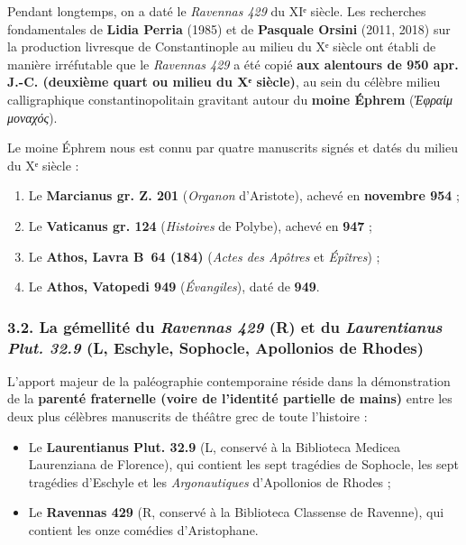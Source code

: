 \documentclass[11pt, a4paper, twoside]{article}
\renewcommand{\_}{\origunderscore\penalty0\relax}
\newcommand{\R}{\textbf{R}}
\def\R{R}%
\begin{document}
Pendant longtemps, on a daté le \textit{Ravennas 429} du XIᵉ siècle. Les recherches fondamentales de \textbf{Lidia Perria} (1985) et de \textbf{Pasquale Orsini} (2011, 2018) sur la production livresque de Constantinople au milieu du Xᵉ siècle ont établi de manière irréfutable que le \textit{Ravennas 429} a été copié \textbf{aux alentours de 950 apr. J.-C. (deuxième quart ou milieu du Xᵉ siècle)}, au sein du célèbre milieu calligraphique constantinopolitain gravitant autour du \textbf{moine Éphrem} (\textit{Ἐφραίμ μοναχός}).

Le moine Éphrem nous est connu par quatre manuscrits signés et datés du milieu du Xᵉ siècle :
\begin{enumerate}[leftmargin=1.6em, itemsep=2pt]
  \item Le \textbf{Marcianus gr. Z. 201} (\textit{Organon} d'Aristote), achevé en \textbf{novembre 954} ;
  \item Le \textbf{Vaticanus gr. 124} (\textit{Histoires} de Polybe), achevé en \textbf{947} ;
  \item Le \textbf{Athos, Lavra B~64 (184)} (\textit{Actes des Apôtres} et \textit{Épîtres}) ;
  \item Le \textbf{Athos, Vatopedi 949} (\textit{Évangiles}), daté de \textbf{949}.
\end{enumerate}


\subsubsection{3.2. La gémellité du \textit{Ravennas 429} (\R{}) et du \textit{Laurentianus Plut. 32.9} (\textnormal{L}, Eschyle, Sophocle, Apollonios de Rhodes)}

L'apport majeur de la paléographie contemporaine réside dans la démonstration de la \textbf{parenté fraternelle (voire de l'identité partielle de mains)} entre les deux plus célèbres manuscrits de théâtre grec de toute l'histoire :
\begin{itemize}[leftmargin=1.5em, itemsep=2pt]
  \item Le \textbf{Laurentianus Plut. 32.9} (\textnormal{L}, conservé à la Biblioteca Medicea Laurenziana de Florence), qui contient les sept tragédies de Sophocle, les sept tragédies d'Eschyle et les \textit{Argonautiques} d'Apollonios de Rhodes ;
  \item Le \textbf{Ravennas 429} (\R{}, conservé à la Biblioteca Classense de Ravenne), qui contient les onze comédies d'Aristophane.
\end{itemize}
\end{document}
